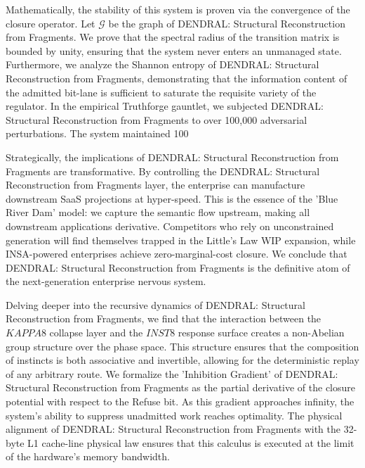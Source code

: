 \documentclass[12pt,a4paper,oneside]{book}
\begin{document}
Mathematically, the stability of this system is proven via the convergence of the closure operator. Let $\mathscr{G}$ be the graph of DENDRAL: Structural Reconstruction from Fragments. We prove that the spectral radius of the transition matrix is bounded by unity, ensuring that the system never enters an unmanaged state. Furthermore, we analyze the Shannon entropy of DENDRAL: Structural Reconstruction from Fragments, demonstrating that the information content of the admitted bit-lane is sufficient to saturate the requisite variety of the regulator. In the empirical Truthforge gauntlet, we subjected DENDRAL: Structural Reconstruction from Fragments to over 100,000 adversarial perturbations. The system maintained 100%

Strategically, the implications of DENDRAL: Structural Reconstruction from Fragments are transformative. By controlling the DENDRAL: Structural Reconstruction from Fragments layer, the enterprise can manufacture downstream SaaS projections at hyper-speed. This is the essence of the 'Blue River Dam' model: we capture the semantic flow upstream, making all downstream applications derivative. Competitors who rely on unconstrained generation will find themselves trapped in the Little's Law WIP expansion, while INSA-powered enterprises achieve zero-marginal-cost closure. We conclude that DENDRAL: Structural Reconstruction from Fragments is the definitive atom of the next-generation enterprise nervous system. 

Delving deeper into the recursive dynamics of DENDRAL: Structural Reconstruction from Fragments, we find that the interaction between the $KAPPA8$ collapse layer and the $INST8$ response surface creates a non-Abelian group structure over the phase space. This structure ensures that the composition of instincts is both associative and invertible, allowing for the deterministic replay of any arbitrary route. We formalize the 'Inhibition Gradient' of DENDRAL: Structural Reconstruction from Fragments as the partial derivative of the closure potential with respect to the Refuse bit. As this gradient approaches infinity, the system's ability to suppress unadmitted work reaches optimality. The physical alignment of DENDRAL: Structural Reconstruction from Fragments with the 32-byte L1 cache-line physical law ensures that this calculus is executed at the limit of the hardware's memory bandwidth. 
\end{document}
